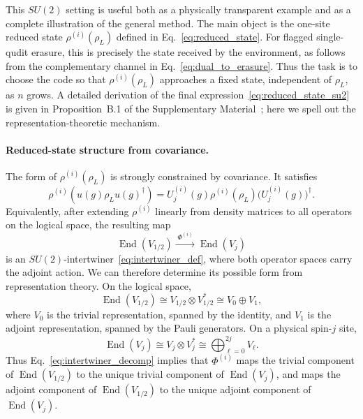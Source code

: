 \documentclass[10pt,twocolumn,superscriptaddress,aps,amsmath,amssymb,citeautoscript,floatfix,prx,longbibliography]{revtex4-2}
\theoremstyle{plain}
\theoremstyle{plain}
\theoremstyle{plain}
\theoremstyle{plain}
\theoremstyle{plain}
\theoremstyle{plain}
\begin{document}
This $SU(2)$ setting is useful both as a physically transparent example and as a complete illustration of the general method. The main object is the one-site reduced state $\rho^{(i)}(\rho_L)$ defined in Eq.~\eqref{eq:reduced_state}. For flagged single-qudit erasure, this is precisely the state received by the environment, as follows from the complementary channel in Eq.~\eqref{eq:dual_to_erasure}. Thus the task is to choose the code so that $\rho^{(i)}(\rho_L)$ approaches a fixed state, independent of $\rho_L$, as $n$ grows. A detailed derivation of the final expression~\eqref{eq:reduced_state_su2} is given in Proposition~B.1 of the Supplementary Material~\cite{SuppMat}; here we spell out the representation-theoretic mechanism.

\paragraph{Reduced-state structure from covariance.}
The form of $\rho^{(i)}(\rho_L)$ is strongly constrained by covariance. It satisfies
\begin{equation}\label{eq:reduced-state_cov_cond}
    \rho^{(i)}\!\left(u(g)\rho_Lu(g)^\dagger\right)
    =
    U_j^{(i)}(g)\rho^{(i)}(\rho_L)\bigl(U_j^{(i)}(g)\bigr)^\dagger .
\end{equation}
Equivalently, after extending $\rho^{(i)}$ linearly from density matrices to all operators on the logical space, the resulting map
\[
    \operatorname{End}(V_{1/2})
    \xrightarrow{\;\Phi^{(i)}\;}
    \operatorname{End}(V_j)
\]
is an $SU(2)$-intertwiner~\eqref{eq:intertwiner_def}, where both operator spaces carry the adjoint action. We can therefore determine its possible form from representation theory. On the logical space,
\[
    \operatorname{End}(V_{1/2})
    \cong
    V_{1/2}\otimes V_{1/2}^*
    \cong
    V_0\oplus V_1,
\]
where $V_0$ is the trivial representation, spanned by the identity, and $V_1$ is the adjoint representation, spanned by the Pauli generators. On a physical spin-$j$ site,
\[
    \operatorname{End}(V_j)
    \cong
    V_j\otimes V_j^*
    \cong
    \bigoplus_{\ell=0}^{2j} V_\ell .
\]
Thus Eq.~\eqref{eq:intertwiner_decomp} implies that $\Phi^{(i)}$ maps the trivial component of $\operatorname{End}(V_{1/2})$ to the unique trivial component of $\operatorname{End}(V_j)$, and maps the adjoint component of $\operatorname{End}(V_{1/2})$ to the unique adjoint component of $\operatorname{End}(V_j)$.
\end{document}
